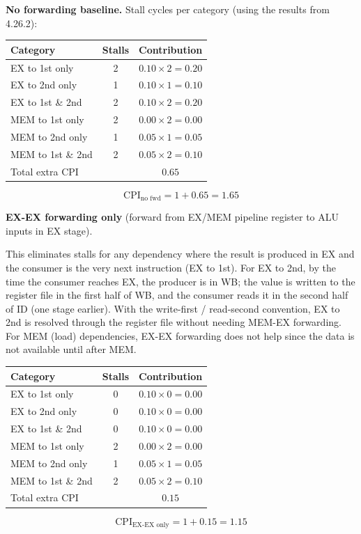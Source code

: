 \textbf{No forwarding baseline.}
Stall cycles per category (using the results from 4.26.2):

\begin{center}
\begin{tabular}{lcc}
\toprule
\textbf{Category} & \textbf{Stalls} & \textbf{Contribution} \\
\midrule
EX to 1st only     & 2 & $0.10 \times 2 = 0.20$ \\
EX to 2nd only     & 1 & $0.10 \times 1 = 0.10$ \\
EX to 1st \& 2nd   & 2 & $0.10 \times 2 = 0.20$ \\
MEM to 1st only    & 2 & $0.00 \times 2 = 0.00$ \\
MEM to 2nd only    & 1 & $0.05 \times 1 = 0.05$ \\
MEM to 1st \& 2nd  & 2 & $0.05 \times 2 = 0.10$ \\
\midrule
\multicolumn{2}{l}{Total extra CPI} & $0.65$ \\
\bottomrule
\end{tabular}
\end{center}
\[
  \text{CPI}_{\text{no fwd}} = 1 + 0.65 = 1.65
\]

\textbf{EX-EX forwarding only}
(forward from EX/MEM pipeline register to ALU inputs in EX stage).

This eliminates stalls for any dependency where the result is produced in EX
and the consumer is the very next instruction (EX to 1st). For EX to 2nd,
by the time the consumer reaches EX, the producer is in WB; the value is
written to the register file in the first half of WB, and the consumer reads
it in the second half of ID (one stage earlier). With the write-first /
read-second convention, EX to 2nd is resolved through the register file
without needing MEM-EX forwarding. For MEM (load) dependencies, EX-EX
forwarding does not help since the data is not available until after MEM.

\begin{center}
\begin{tabular}{lcc}
\toprule
\textbf{Category} & \textbf{Stalls} & \textbf{Contribution} \\
\midrule
EX to 1st only     & 0 & $0.10 \times 0 = 0.00$ \\
EX to 2nd only     & 0 & $0.10 \times 0 = 0.00$ \\
EX to 1st \& 2nd   & 0 & $0.10 \times 0 = 0.00$ \\
MEM to 1st only    & 2 & $0.00 \times 2 = 0.00$ \\
MEM to 2nd only    & 1 & $0.05 \times 1 = 0.05$ \\
MEM to 1st \& 2nd  & 2 & $0.05 \times 2 = 0.10$ \\
\midrule
\multicolumn{2}{l}{Total extra CPI} & $0.15$ \\
\bottomrule
\end{tabular}
\end{center}
\[
  \text{CPI}_{\text{EX-EX only}} = 1 + 0.15 = 1.15
\]

